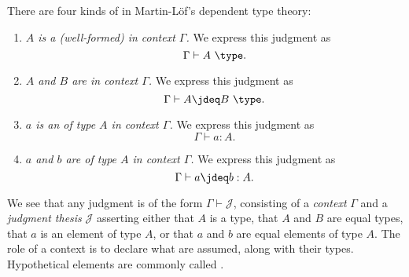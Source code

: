 \begin{defn}\label{defn:judgments}
  There are four kinds of  in Martin-L\"of's dependent type theory:
  \begin{enumerate}
  \item \emph{$A$ is a (well-formed)  in context $\Gamma$.}
    We express this judgment as
    \begin{equation*}
      \Gamma\vdash A~\type.
    \end{equation*}
  \item \emph{$A$ and $B$ are  in context $\Gamma$.}
     We express this judgment as
    \begin{equation*}
      \Gamma\vdash A \jdeq B~\type.
    \end{equation*}
  \item \emph{$a$ is an  of type $A$ in context $\Gamma$.} We express this judgment as
    \begin{equation*}
      \Gamma \vdash a:A.
    \end{equation*}
  \item \emph{$a$ and $b$ are  of type $A$ in context $\Gamma$.} We express this judgment as
    \begin{equation*}
      \Gamma\vdash a\jdeq b:A.
    \end{equation*}
  \end{enumerate}
\end{defn}

We see that any judgment is of the form $\Gamma\vdash\mathcal{J}$, consisting of a \emph{context} $\Gamma$ and a \emph{judgment thesis} $\mathcal{J}$ asserting either that $A$ is a type, that $A$ and $B$ are equal types, that $a$ is an element of type $A$, or that $a$ and $b$ are equal elements of type $A$. The role of a context is to declare what  are assumed, along with their types. Hypothetical elements are commonly called .

